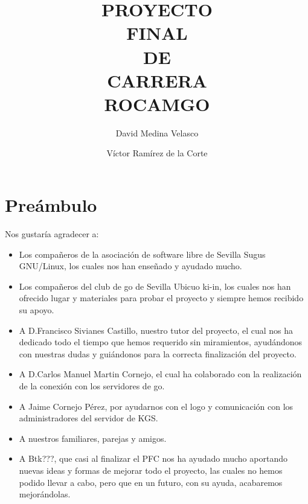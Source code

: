 \documentclass[12pt,a4paper]{report}
\begin{document}

\title{PROYECTO\\ FINAL\\ DE \\CARRERA \\ ROCAMGO\\}
\author{David Medina Velasco \and Víctor Ramírez de la Corte}
\maketitle

\marginsize{3cm}{2cm}{2cm}{2cm} %
\tableofcontents  %

 
\chapter*{Preámbulo} 

Nos gustaría agradecer a: 
\begin{itemize} 
    \item Los compañeros de la asociación de software libre de Sevilla Sugus 
    GNU/Linux, los cuales nos han enseñado y ayudado mucho.  
    \item Los compañeros del club de go de Sevilla Ubicuo ki-in, los cuales nos
    han ofrecido lugar y materiales para probar el proyecto y siempre hemos 
    recibido su apoyo.  
    \item A D.Francisco Sivianes Castillo, nuestro tutor del proyecto, el cual 
    nos ha dedicado todo el tiempo que hemos requerido sin miramientos, 
    ayudándonos con nuestras dudas y guiándonos para la correcta finalización 
    del proyecto.  
    \item A D.Carlos Manuel Martin Cornejo, el cual ha colaborado con la 
    realización de la conexión con los servidores de go.  
    \item A Jaime Cornejo Pérez, por ayudarnos con el logo y comunicación con 
    los administradores del servidor de KGS.  
    \item A nuestros familiares, parejas y amigos.
    \item A Btk???, que casi al finalizar el PFC nos ha ayudado mucho aportando
    nuevas ideas y formas de mejorar todo el proyecto, las cuales no hemos
    podido llevar a cabo, pero que en un futuro, con su ayuda, acabaremos
    mejorándolas. %
\end{itemize}
\end{document}
